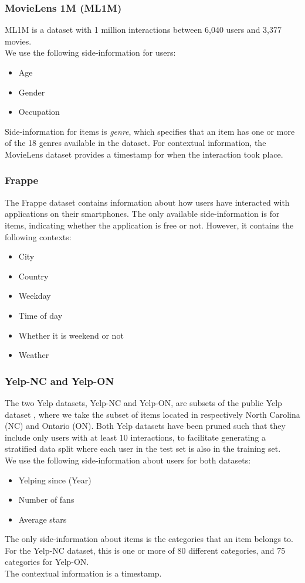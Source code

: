 \subsubsection*{MovieLens 1M (ML1M)}
ML1M is a dataset \cite{ml1m} with 1 million interactions between 6,040 users and 3,377 movies.\\
We use the following side-information for users:
\begin{itemize}
    \item Age
    \item Gender
    \item Occupation
\end{itemize}
Side-information for items is \textit{genre}, which specifies that an item has one or more of the 18 genres available in the dataset.
For contextual information, the MovieLens dataset provides a timestamp for when the interaction took place.

\subsubsection*{Frappe}
The Frappe dataset \cite{baltrunasfrappe} contains information about how users have interacted with applications on their smartphones.
The only available side-information is for items, indicating whether the application is free or not.
However, it contains the following contexts:
\begin{itemize}
    \item City
    \item Country
    \item Weekday
    \item Time of day
    \item Whether it is weekend or not
    \item Weather
\end{itemize}

\subsubsection*{Yelp-NC and Yelp-ON}
The two Yelp datasets, Yelp-NC and Yelp-ON, are subsets of the public Yelp dataset \cite{yelp}, where we take the subset of items located in respectively North Carolina (NC) and Ontario (ON).
Both Yelp datasets have been pruned such that they include only users with at least 10 interactions, to facilitate generating a stratified data split where each user in the test set is also in the training set.\\
We use the following side-information about users for both datasets:
\begin{itemize}
    \item Yelping since (Year)
    \item Number of fans
    \item Average stars
\end{itemize}
The only side-information about items is the categories that an item belongs to.
For the Yelp-NC dataset, this is one or more of 80 different categories, and 75 categories for Yelp-ON.\\
The contextual information is a timestamp.

